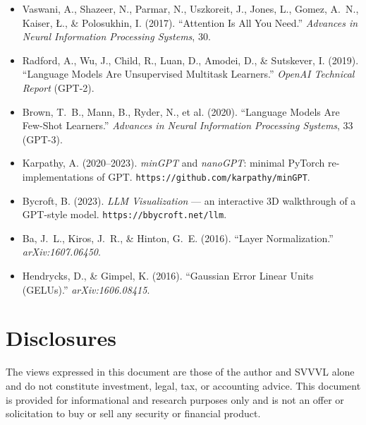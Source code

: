 \documentclass[11pt]{article}
\begin{document}
\begin{itemize}\setlength{\itemsep}{0.4em}

  \item[{[1]}]\hypertarget{ref:1}{} Vaswani, A., Shazeer, N., Parmar, N., Uszkoreit,
    J., Jones, L., Gomez, A.~N., Kaiser, \L., \& Polosukhin, I. (2017).
    ``Attention Is All You Need.'' \textit{Advances in Neural Information
    Processing Systems}, 30.

  \item[{[2]}]\hypertarget{ref:2}{} Radford, A., Wu, J., Child, R., Luan, D.,
    Amodei, D., \& Sutskever, I. (2019). ``Language Models Are Unsupervised
    Multitask Learners.'' \textit{OpenAI Technical Report} (GPT-2).

  \item[{[3]}]\hypertarget{ref:3}{} Brown, T.~B., Mann, B., Ryder, N., et al.
    (2020). ``Language Models Are Few-Shot Learners.'' \textit{Advances in Neural
    Information Processing Systems}, 33 (GPT-3).

  \item[{[4]}]\hypertarget{ref:4}{} Karpathy, A. (2020--2023). \textit{minGPT} and
    \textit{nanoGPT}: minimal PyTorch re-implementations of GPT.
    \texttt{https://github.com/karpathy/minGPT}.

  \item[{[5]}]\hypertarget{ref:5}{} Bycroft, B. (2023). \textit{LLM Visualization}
    --- an interactive 3D walkthrough of a GPT-style model.
    \texttt{https://bbycroft.net/llm}.

  \item[{[6]}]\hypertarget{ref:6}{} Ba, J.~L., Kiros, J.~R., \& Hinton, G.~E.
    (2016). ``Layer Normalization.'' \textit{arXiv:1607.06450}.

  \item[{[7]}]\hypertarget{ref:7}{} Hendrycks, D., \& Gimpel, K. (2016).
    ``Gaussian Error Linear Units (GELUs).'' \textit{arXiv:1606.08415}.

\end{itemize}

\newpage
\section{Disclosures}

The views expressed in this document are those of the author and
SVVVL alone and do not constitute investment, legal, tax, or
accounting advice. This document is provided for informational and
research purposes only and is not an offer or solicitation to buy or
sell any security or financial product.
\end{document}
